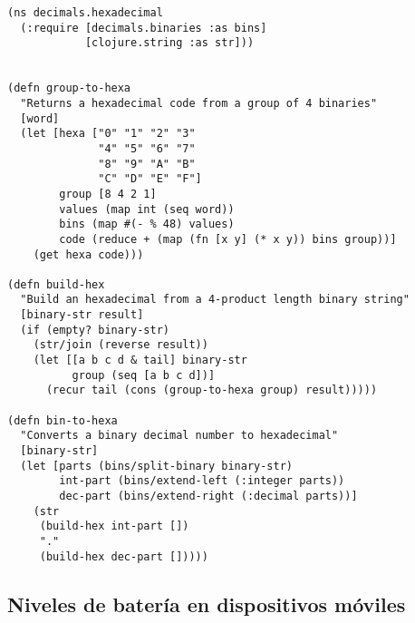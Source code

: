 \documentclass[stu, 12pt, letterpaper, donotrepeattitle, floatsintext, natbib]{apa7}
\begin{document}
\begin{verbatim}
(ns decimals.hexadecimal
  (:require [decimals.binaries :as bins]
            [clojure.string :as str]))


(defn group-to-hexa 
  "Returns a hexadecimal code from a group of 4 binaries" 
  [word]
  (let [hexa ["0" "1" "2" "3"
              "4" "5" "6" "7" 
              "8" "9" "A" "B" 
              "C" "D" "E" "F"]
        group [8 4 2 1]
        values (map int (seq word))
        bins (map #(- % 48) values)
        code (reduce + (map (fn [x y] (* x y)) bins group))]
    (get hexa code)))

(defn build-hex 
  "Build an hexadecimal from a 4-product length binary string" 
  [binary-str result]
  (if (empty? binary-str) 
    (str/join (reverse result))
    (let [[a b c d & tail] binary-str
          group (seq [a b c d])]
      (recur tail (cons (group-to-hexa group) result)))))

(defn bin-to-hexa 
  "Converts a binary decimal number to hexadecimal"
  [binary-str]
  (let [parts (bins/split-binary binary-str)
        int-part (bins/extend-left (:integer parts))
        dec-part (bins/extend-right (:decimal parts))]
    (str 
     (build-hex int-part []) 
     "." 
     (build-hex dec-part []))))
\end{verbatim}

\subsection{Niveles de batería en dispositivos móviles}
\end{document}
